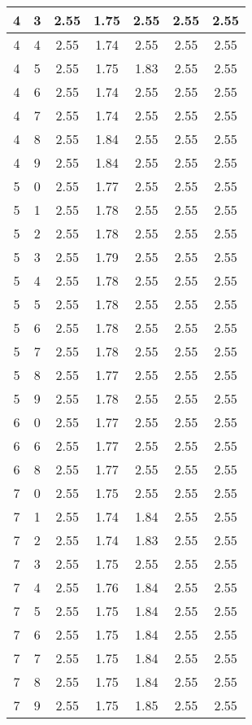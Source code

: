 \begin{longtable}{|c|c||c||c|c||c|c|}
	4 & 3 & 2.55 & 1.75 & 2.55 & 2.55 & 2.55 \\ \hline
	4 & 4 & 2.55 & 1.74 & 2.55 & 2.55 & 2.55 \\ \hline
	4 & 5 & 2.55 & 1.75 & 1.83 & 2.55 & 2.55 \\ \hline
	4 & 6 & 2.55 & 1.74 & 2.55 & 2.55 & 2.55 \\ \hline
	4 & 7 & 2.55 & 1.74 & 2.55 & 2.55 & 2.55 \\ \hline
	4 & 8 & 2.55 & 1.84 & 2.55 & 2.55 & 2.55 \\ \hline
	4 & 9 & 2.55 & 1.84 & 2.55 & 2.55 & 2.55 \\ \hline
	5 & 0 & 2.55 & 1.77 & 2.55 & 2.55 & 2.55 \\ \hline
	5 & 1 & 2.55 & 1.78 & 2.55 & 2.55 & 2.55 \\ \hline
	5 & 2 & 2.55 & 1.78 & 2.55 & 2.55 & 2.55 \\ \hline
	5 & 3 & 2.55 & 1.79 & 2.55 & 2.55 & 2.55 \\ \hline
	5 & 4 & 2.55 & 1.78 & 2.55 & 2.55 & 2.55 \\ \hline
	5 & 5 & 2.55 & 1.78 & 2.55 & 2.55 & 2.55 \\ \hline
	5 & 6 & 2.55 & 1.78 & 2.55 & 2.55 & 2.55 \\ \hline
	5 & 7 & 2.55 & 1.78 & 2.55 & 2.55 & 2.55 \\ \hline
	5 & 8 & 2.55 & 1.77 & 2.55 & 2.55 & 2.55 \\ \hline
	5 & 9 & 2.55 & 1.78 & 2.55 & 2.55 & 2.55 \\ \hline
	6 & 0 & 2.55 & 1.77 & 2.55 & 2.55 & 2.55 \\ \hline
	6 & 6 & 2.55 & 1.77 & 2.55 & 2.55 & 2.55 \\ \hline
	6 & 8 & 2.55 & 1.77 & 2.55 & 2.55 & 2.55 \\ \hline
	7 & 0 & 2.55 & 1.75 & 2.55 & 2.55 & 2.55 \\ \hline
	7 & 1 & 2.55 & 1.74 & 1.84 & 2.55 & 2.55 \\ \hline
	7 & 2 & 2.55 & 1.74 & 1.83 & 2.55 & 2.55 \\ \hline
	7 & 3 & 2.55 & 1.75 & 2.55 & 2.55 & 2.55 \\ \hline
	7 & 4 & 2.55 & 1.76 & 1.84 & 2.55 & 2.55 \\ \hline
	7 & 5 & 2.55 & 1.75 & 1.84 & 2.55 & 2.55 \\ \hline
	7 & 6 & 2.55 & 1.75 & 1.84 & 2.55 & 2.55 \\ \hline
	7 & 7 & 2.55 & 1.75 & 1.84 & 2.55 & 2.55 \\ \hline
	7 & 8 & 2.55 & 1.75 & 1.84 & 2.55 & 2.55 \\ \hline
	7 & 9 & 2.55 & 1.75 & 1.85 & 2.55 & 2.55 \\ \hline
\end{longtable}
